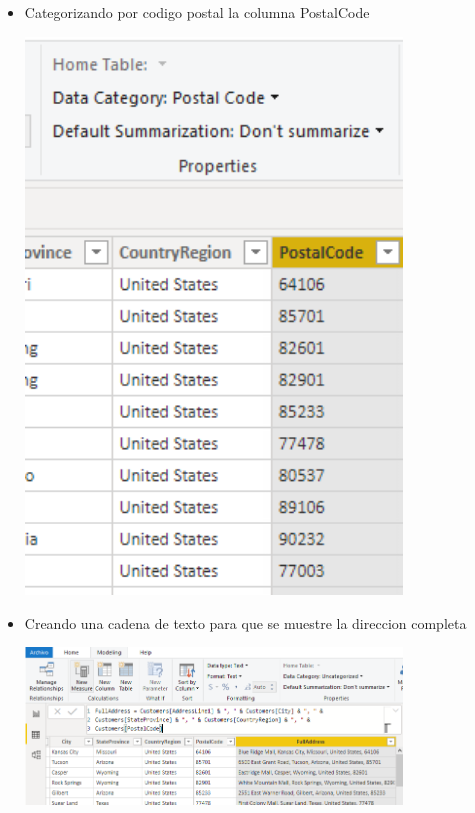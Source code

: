 \begin{itemize}
	\item Categorizando por codigo postal la columna PostalCode
	\begin{center}
	\includegraphics[width=10cm]{./Imagenes/Captura2-9} 
	\end{center}
\end{itemize} 
\begin{itemize}
	\item Creando una cadena de texto para que se muestre la direccion completa
	\begin{center}
	\includegraphics[width=10cm]{./Imagenes/Captura2-10} 
	\end{center}
\end{itemize} 
